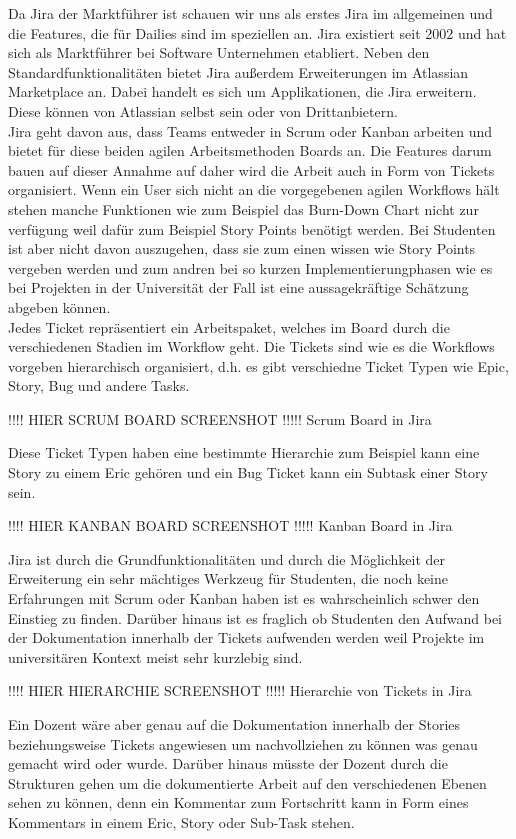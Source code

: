 Da Jira der Marktführer ist schauen wir uns als erstes Jira im allgemeinen und die Features, die für Dailies sind im speziellen an. Jira existiert seit 2002 und hat sich als Marktführer bei Software Unternehmen etabliert. Neben den Standardfunktionalitäten bietet Jira außerdem Erweiterungen im Atlassian Marketplace an. Dabei handelt es sich um Applikationen, die Jira erweitern. Diese können von Atlassian selbst sein oder von Drittanbietern.\\
Jira geht davon aus, dass Teams entweder in Scrum oder Kanban arbeiten und bietet für diese beiden agilen Arbeitsmethoden Boards an. Die Features darum bauen auf dieser Annahme auf daher wird die Arbeit auch in Form von Tickets organisiert. Wenn ein User sich nicht an die vorgegebenen agilen Workflows hält stehen manche Funktionen wie zum Beispiel das Burn-Down Chart nicht zur verfügung weil dafür zum Beispiel Story Points benötigt werden. Bei Studenten ist aber nicht davon auszugehen, dass sie zum einen wissen wie Story Points vergeben werden und zum andren bei so kurzen Implementierungphasen wie es bei Projekten in der Universität der Fall ist eine aussagekräftige Schätzung abgeben können. \\
Jedes Ticket repräsentiert ein Arbeitspaket, welches im Board durch die verschiedenen Stadien im Workflow geht. Die Tickets sind wie es die Workflows vorgeben hierarchisch organisiert, d.h. es gibt verschiedne Ticket Typen wie Epic, Story, Bug und andere Tasks.

!!!! HIER SCRUM BOARD SCREENSHOT !!!!!
Scrum Board in Jira  

Diese Ticket Typen haben eine bestimmte Hierarchie zum Beispiel kann eine Story zu einem Eric gehören und ein Bug Ticket kann ein Subtask einer Story sein. 

!!!! HIER KANBAN BOARD SCREENSHOT !!!!!
Kanban Board in Jira  

Jira ist durch die Grundfunktionalitäten und durch die Möglichkeit der Erweiterung ein sehr mächtiges Werkzeug für Studenten, die noch keine Erfahrungen mit Scrum oder Kanban haben ist es wahrscheinlich schwer den Einstieg zu finden.  Darüber hinaus ist es fraglich ob Studenten den Aufwand bei der Dokumentation innerhalb der Tickets aufwenden werden weil Projekte im universitären Kontext meist sehr kurzlebig sind.  

!!!! HIER HIERARCHIE SCREENSHOT !!!!!
Hierarchie von Tickets in Jira 

Ein Dozent wäre aber genau auf die Dokumentation innerhalb der Stories beziehungsweise Tickets angewiesen um nachvollziehen zu können was genau gemacht wird oder wurde. Darüber hinaus müsste der Dozent durch die Strukturen gehen um die dokumentierte Arbeit auf den verschiedenen Ebenen sehen zu können, denn ein Kommentar zum Fortschritt kann in Form eines Kommentars in einem Eric, Story oder Sub-Task stehen. 

